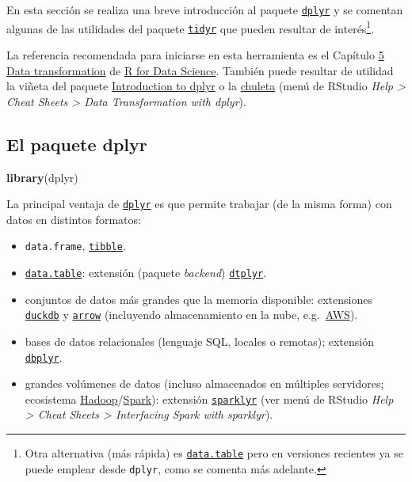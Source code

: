 \documentclass[
]{book}
\newenvironment{Shaded}{\begin{snugshade}}{\end{snugshade}}
\newcommand{\FunctionTok}[1]{\textcolor[rgb]{0.13,0.29,0.53}{\textbf{#1}}}
\newcommand{\NormalTok}[1]{#1}
\theoremstyle{break}
\theoremstyle{nonumberplain}
\let\oldfootnote\footnote
\renewcommand\footnote[1]{\oldfootnote{\hspace{2mm}#1}}
\begin{document}
En esta sección se realiza una breve introducción al paquete \href{https://dplyr.tidyverse.org}{\texttt{dplyr}} y se comentan algunas de las utilidades del paquete \href{https://tidyr.tidyverse.org}{\texttt{tidyr}} que pueden resultar de interés\footnote{Otra alternativa (más rápida) es \href{https://rdatatable.gitlab.io/data.table}{\texttt{data.table}} pero en versiones recientes ya se puede emplear desde \texttt{dplyr}, como se comenta más adelante.}.

La referencia recomendada para iniciarse en esta herramienta es el Capítulo \href{http://r4ds.had.co.nz/transform.html}{5 Data transformation} de
\href{http://r4ds.had.co.nz}{R for Data Science}.
También puede resultar de utilidad la viñeta del paquete \href{https://dplyr.tidyverse.org/articles/dplyr.html}{Introduction to dplyr} o la \href{https://posit.co/wp-content/uploads/2022/10/data-transformation-1.pdf}{chuleta} (menú de RStudio \emph{Help \textgreater{} Cheat Sheets \textgreater{} Data Transformation with dplyr}).

\subsection{El paquete dplyr}\label{dplyr-pkg}

\begin{Shaded}
\begin{Highlighting}[]
\FunctionTok{library}\NormalTok{(dplyr)}
\end{Highlighting}
\end{Shaded}

La principal ventaja de \href{https://dplyr.tidyverse.org/index.html}{\texttt{dplyr}} es que permite trabajar (de la misma forma) con datos en distintos formatos:

\begin{itemize}
\item
  \texttt{data.frame}, \href{https://tibble.tidyverse.org/}{\texttt{tibble}}.
\item
  \href{https://rdatatable.gitlab.io/data.table}{\texttt{data.table}}: extensión (paquete \emph{backend}) \href{https://dtplyr.tidyverse.org}{\texttt{dtplyr}}.
\item
  conjuntos de datos más grandes que la memoria disponible: extensiones \href{https://duckdb.org/docs/api/r}{\texttt{duckdb}} y \href{https://arrow.apache.org/docs/r/}{\texttt{arrow}} (incluyendo almacenamiento en la nube, e.g.~\href{https://aws.amazon.com/es/s3}{AWS}).
\item
  bases de datos relacionales (lenguaje SQL, locales o remotas); extensión \href{https://dbplyr.tidyverse.org}{\texttt{dbplyr}}.
\item
  grandes volúmenes de datos (incluso almacenados en múltiples servidores; ecosistema \href{http://hadoop.apache.org/}{Hadoop}/\href{https://spark.apache.org/}{Spark}): extensión \href{https://spark.rstudio.com}{\texttt{sparklyr}} (ver menú de RStudio \emph{Help \textgreater{} Cheat Sheets \textgreater{} Interfacing Spark with sparklyr}).
\end{itemize}
\end{document}
